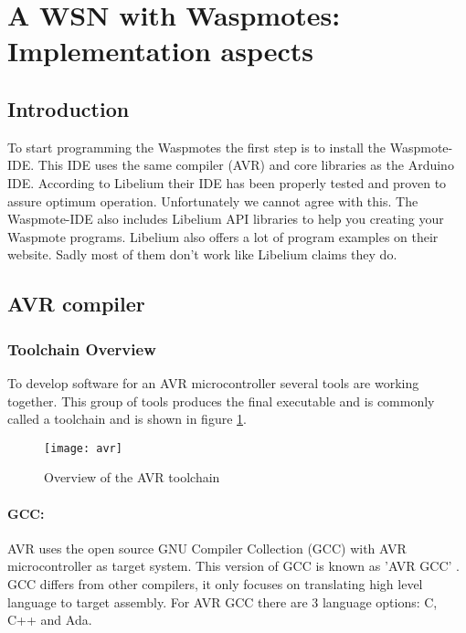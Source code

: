 \section{A WSN with Waspmotes: Implementation aspects}
\subsection{Introduction}
To start programming the Waspmotes the first step is to install the Waspmote-IDE. This IDE uses the same compiler (AVR) and core libraries as the Arduino IDE. According to Libelium their IDE has been properly tested and proven to assure optimum operation. Unfortunately we cannot agree with this. The Waspmote-IDE also includes Libelium API libraries to help you creating your Waspmote programs. Libelium also offers a lot of program examples on their website. Sadly most of them don't work like Libelium claims they do.
\subsection{AVR compiler}
\subsubsection{Toolchain Overview}
To develop software for an AVR microcontroller several tools are working together. This group of tools produces the final executable and is commonly called a toolchain and is shown in figure \ref{fig:tool}. 
\begin{figure}[ht]
\centering
\texttt{[image: avr]}
\caption{Overview of the AVR toolchain}
\label{fig:tool}
\end{figure}
\paragraph{GCC:} AVR uses the open source GNU Compiler Collection (GCC) with AVR microcontroller as target system. This version of GCC is known as 'AVR GCC' . GCC differs from other compilers, it only focuses on translating high level language to target assembly. For AVR GCC there are 3 language options: C, C++ and Ada. 
